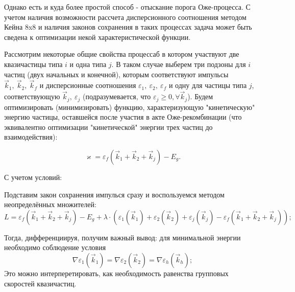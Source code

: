 \documentclass[../main.tex]{subfiles}
\begin{document}
        Однако есть и куда более простой способ - отыскание порога Оже-процесса.
        С учетом наличия возможности рассчета дисперсионного соотношения методом Кейна 8x8
        \cite{HgCdTeCalcZholudev} и наличия законов сохранения в таких
        процессах задача может быть сведена к оптимизации некой характеристической
        функции.

        Рассмотрим некоторые общие свойства процессаб в котором участвуют две
        квазичастицы типа $i$ и одна типа $j$. В таком случае выберем три подзоны для 
        $i$ частиц (двух начальных и конечной), которым соответствуют импульсы 
        $\vec{k}_1,~\vec{k}_2,~\vec{k}_f$ и дисперсионные 
        соотношения $\varepsilon_1,~\varepsilon_2,~\varepsilon_f$ и одну для частицы типа $j$,
        соответствующую $\vec{k}_j,~\varepsilon_j$ (подразумевается, что 
        $\varepsilon_j \geq 0, \forall \vec{k}_j$). Будем оптимизировать (минимизировать) функцию, 
        характеризующую "кинетическую" энергию частицы, оставшейся после участия в акте Оже-рекомбинации 
        (что эквивалентно оптимизации "кинетической" энергии трех частиц до взаимодействия):
        
        \begin{equation}
            \varkappa = \varepsilon_f(\vec{k}_1 + \vec{k}_2 + \vec{k}_j) - E_g.
        \end{equation}

        С учетом условий:

        Подставим закон сохранения импулься сразу и воспользуемся методом неопределённых множителей:
        \begin{equation}
            L = \varepsilon_f(\vec{k}_1 + \vec{k}_2 + \vec{k}_j) - E_g + \lambda \cdot \left(\varepsilon_1(\vec{k}_1) + 
            \varepsilon_2(\vec{k}_2) + \varepsilon_j(\vec{k}_j) - \varepsilon_f(\vec{k}_1 + \vec{k}_2 + \vec{k}_j)\right);
        \end{equation}

        Тогда, дифференциируя, получим важный  вывод: для минимальной энергии необходимо соблюдение условия
        \begin{equation}
            \nabla \varepsilon_1(\vec{k}_1) = \nabla \varepsilon_2(\vec{k}_2) = \nabla \varepsilon_h(\vec{k}_h);
        \end{equation}
        Это можно интерперетировать, как необходимость равенства групповых скоростей квазичастиц.
        
\end{document}
